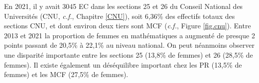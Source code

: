 
En 2021, il y avait 3045 EC dans les sections 25 et 26 du Conseil National des Universit\'es (CNU, \textit{c.f.}, Chapitre \ref{CNU}), soit 6,36\% des effectifs totaux des sections CNU, et dont environ deux tiers sont MCF (\textit{c.f.}, Figure \ref{fig.cnu}). Entre 2013 et 2021 la proportion de femmes en math\'ematiques a augment\'e de presque 2 points passant de 20,5\% \`a 22,1\% au niveau national. On peut n\'eanmoins observer une disparit\'e importante entre les sections 25 (13,8\% de femmes) et 26 (28,5\% de femmes). Il existe \'egalement un d\'es\'equilibre important chez les PR (13,5\% de femmes) et les MCF (27,5\% de femmes).


